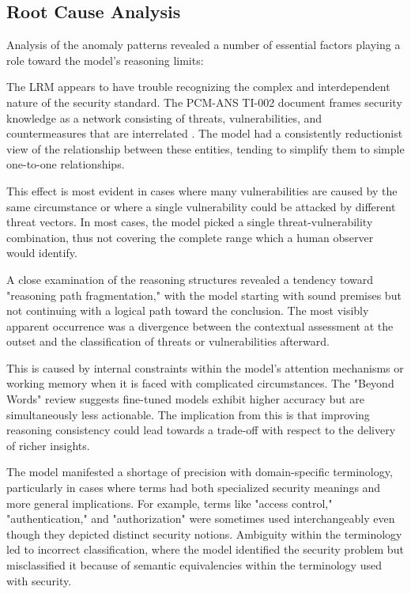 \documentclass[sigconf]{acmart}
\begin{document}
\subsection{Root Cause Analysis}
Analysis of the anomaly patterns revealed a number of essential factors playing a role toward the model's reasoning limits:

The LRM appears to have trouble recognizing the complex and interdependent nature of the security standard. The PCM-ANS TI-002 document frames security knowledge as a network consisting of threats, vulnerabilities, and countermeasures that are interrelated \citep{NationalSecurity1995}. The model had a consistently reductionist view of the relationship between these entities, tending to simplify them to simple one-to-one relationships. 

This effect is most evident in cases where many vulnerabilities are caused by the same circumstance or where a single vulnerability could be attacked by different threat vectors. In most cases, the model picked a single threat-vulnerability combination, thus not covering the complete range which a human observer would identify. 

A close examination of the reasoning structures revealed a tendency toward "reasoning path fragmentation," with the model starting with sound premises but not continuing with a logical path toward the conclusion. The most visibly apparent occurrence was a divergence between the contextual assessment at the outset and the classification of threats or vulnerabilities afterward. 

This is caused by internal constraints within the model's attention mechanisms or working memory when it is faced with complicated circumstances. The "Beyond Words" review suggests fine-tuned models exhibit higher accuracy but are simultaneously less actionable. The implication from this is that improving reasoning consistency could lead towards a trade-off with respect to the delivery of richer insights.

The model manifested a shortage of precision with domain-specific terminology, particularly in cases where terms had both specialized security meanings and more general implications. For example, terms like "access control," "authentication," and "authorization" were sometimes used interchangeably even though they depicted distinct security notions. Ambiguity within the terminology led to incorrect classification, where the model identified the security problem but misclassified it because of semantic equivalencies within the terminology used with security.
\end{document}

